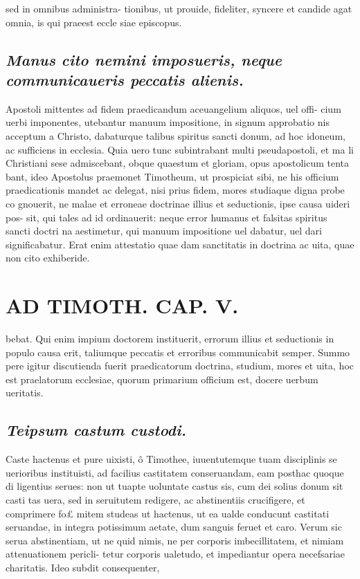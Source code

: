 \documentclass{article}
\begin{document}
\begin{pages}
sed in omnibus administra- tionibus, ut prouide, fideliter, syncere et candide agat omnia, is qui praeest eccle siae episcopus.  \pend
{}
{}
\subsection*{\textit{Manus cito nemini imposueris, neque communicaueris peccatis alienis. }}\pstart Apostoli mittentes ad fidem praedicandum aceuangelium aliquos, uel offi- cium uerbi imponentes, utebantur manuum impositione, in signum approbatio nis acceptum a Christo, dabaturque talibus spiritus sancti donum, ad hoc idoneum, ac sufficiens in ecclesia. Quia uero tunc subintrabant multi pseudapostoli, et ma li Christiani sese admiscebant, obque quaestum et gloriam, opus apostolicum tenta bant, ideo Apostolus praemonet Timotheum, ut prospiciat sibi, ne his officium praedicationis mandet ac delegat, nisi prius fidem, mores studiaque digna probe co gnouerit, ne malae et erroneae doctrinae illius et seductionis, ipse causa uideri pos- sit, qui tales ad id ordinauerit: neque error humanus et falsitas spiritus sancti doctri na aestimetur, qui manuum impositione uel dabatur, uel dari significabatur. Erat enim attestatio quae dam sanctitatis in doctrina ac uita, quae non cito exhiberide.  \pend
\section*{AD TIMOTH. CAP. V. }
\marginpar{[ p.527 ]}\pstart bebat. Qui enim impium doctorem instituerit, errorum illius et seductionis in populo causa erit, taliumque peccatis et erroribus communicabit semper. Summo pere igitur discutienda fuerit praedicatorum doctrina, studium, mores et uita, hoc est praelatorum ecclesiae, quorum primarium officium est, docere uerbum ueritatis.  \pend
{}
{}
\subsection*{\textit{Teipsum castum custodi. }}\pstart Caste hactenus et pure uixisti, ô Timothee, iuuentutemque tuam disciplinis se uerioribus instituisti, ad facilius castitatem conseruandam, eam posthac quoque di ligentius serues: non ut tuapte uoluntate castus sis, cum dei solius donum sit casti tas uera, sed in seruitutem redigere, ac abstinentiis crucifigere, et comprimere fo£ mitem studeas ut hactenus, ut ea ualde conducunt castitati seruandae, in integra potissimum aetate, dum sanguis feruet et caro. Verum sic serua abstinentiam, ut ne quid nimis, ne per corporis imbecillitatem, et nimiam attenuationem pericli- tetur corporis ualetudo, et impediantur opera necefsariae charitatis. Ideo subdit consequenter,  \pend
{}
{}

\end{pages}
\end{document}
